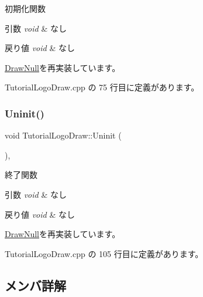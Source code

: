 初期化関数 


\begin{DoxyParams}{引数}
{\em void} & なし \\
\hline
\end{DoxyParams}

\begin{DoxyRetVals}{戻り値}
{\em void} & なし \\
\hline
\end{DoxyRetVals}


\mbox{\hyperlink{class_draw_null_a20aef1e54c1a158b741bfd731e18efdf}{Draw\+Null}}を再実装しています。



 Tutorial\+Logo\+Draw.\+cpp の 75 行目に定義があります。

\mbox{\label{class_tutorial_logo_draw_a949fb70954e3df28f87b8ed5c61bf8f1}} 
\subsubsection{\texorpdfstring{Uninit()}{Uninit()}}
{\footnotesize\ttfamily void Tutorial\+Logo\+Draw\+::\+Uninit (\begin{DoxyParamCaption}{ }\end{DoxyParamCaption})\hspace{0.3cm}{\ttfamily [override]}, {\ttfamily [virtual]}}



終了関数 


\begin{DoxyParams}{引数}
{\em void} & なし \\
\hline
\end{DoxyParams}

\begin{DoxyRetVals}{戻り値}
{\em void} & なし \\
\hline
\end{DoxyRetVals}


\mbox{\hyperlink{class_draw_null_a6e81d63efab7333e8d0e8af99362a4d9}{Draw\+Null}}を再実装しています。



 Tutorial\+Logo\+Draw.\+cpp の 105 行目に定義があります。



\subsection{メンバ詳解}
\mbox{\label{class_tutorial_logo_draw_a7e846a5906f376d535e7c5e998103857}} 
